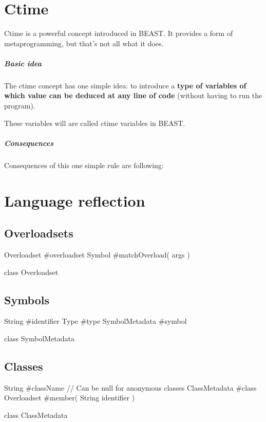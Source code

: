 \chapter{Ctime}
Ctime is a powerful concept introduced in BEAST. It provides a form of metaprogramming, but that's not all what it does.

\paragraph{Basic idea}
The ctime concept has one simple idea: to introduce a \textbf{type of variables of which value can be deduced at any line of code} (without having to run the program).

These variables will are called ctime variables in BEAST.

\paragraph{Consequences} Consequences of this one simple rule are following:

\chapter{Language reflection}

\section{Overloadsets}
\begin{code}
Overloadset #overloadset
Symbol #matchOverload( args )

class Overloadset {
}
\end{code}

\section{Symbols}
\begin{code}
String #identifier
Type #type
SymbolMetadata #symbol

class SymbolMetadata {

}
\end{code}

\section{Classes}
\begin{code}
String #className // Can be null for anonymous classes
ClassMetadata #class
Overloadset #member( String identifier )

class ClassMetadata {
}
\end{code}

